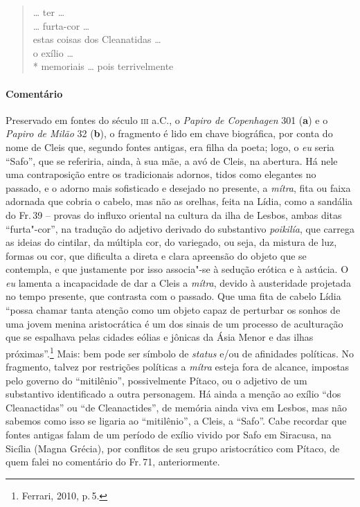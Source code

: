 {\begin{verse}
\hspace*{16mm}

\ldots{} ter \ldots{}\\
\ldots{} furta-cor \ldots{}\\
estas coisas dos Cleanatidas \ldots{}\\
o exílio \ldots{}\\*
memoriais \ldots{} pois terrivelmente 
\end{verse}

\pagebreak

{\paragraph{Comentário} Preservado em fontes do século \textsc{iii} a.C., o \textit{Papiro de Copenhagen} 301 (\textbf{a}) e o \textit{Papiro de Milão} 32 (\textbf{b}),
o fragmento é lido em chave biográfica, por conta do
nome de Cleis que, segundo fontes antigas, era filha da poeta; logo, o \textit{eu} seria
``Safo'', que se referiria, ainda, à sua mãe, a avó de Cleis, na
abertura. Há nele uma contraposição entre os tradicionais adornos, tidos como
elegantes no passado, e o adorno mais sofisticado e desejado no presente, a
\textit{mítra}, fita ou faixa adornada que cobria o cabelo, mas não as orelhas,
feita na Lídia, como a sandália do Fr.\,39 -- provas do influxo oriental na
cultura da ilha de Lesbos, ambas ditas ``furta"-cor'', na tradução do
adjetivo derivado do substantivo \textit{poikilía}, que carrega as ideias do
cintilar, da múltipla cor, do variegado, ou seja, da mistura de luz, formas ou
cor, que dificulta a direta e clara apreensão do objeto que se contempla, e que
justamente por isso associa"-se à sedução erótica e à astúcia. O \textit{eu} lamenta a
incapacidade de dar a Cleis a \textit{mítra}, devido à austeridade projetada no tempo presente, que contrasta com o passado. Que uma fita de cabelo Lídia ``possa chamar tanta atenção como um objeto capaz de perturbar os sonhos de uma jovem menina aristocrática é um dos sinais de um processo de aculturação que se espalhava pelas cidades eólias e jônicas da Ásia Menor e das ilhas próximas''.\footnote{Ferrari, 2010, p.\,5.} Mais: bem pode ser símbolo de \textit{status} e/ou de afinidades políticas. No fragmento, talvez por restrições políticas a \textit{mítra} esteja fora de alcance,  impostas pelo governo do ``mitilênio'', possivelmente
Pítaco, ou o adjetivo de um substantivo identificado a outra personagem. Há
ainda a menção ao exílio ``dos Cleanactidas'' ou ``de Cleanactides'', de memória
ainda viva em Lesbos, mas não sabemos como isso se ligaria ao
``mitilênio'', a Cleis, a ``Safo''. Cabe recordar que fontes antigas falam
de um período de exílio vivido por Safo em Siracusa, na Sicília (Magna Grécia),
por conflitos de seu grupo aristocrático com Pítaco, de quem falei no comentário do Fr.\,71, anteriormente.}



}
